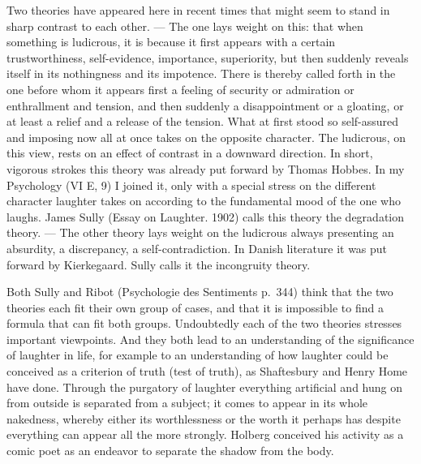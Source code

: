 \documentclass[12pt]{book}
\newcommand{\opage}[1]{\marginnote{\footnotesize\textit{[#1]}}}
\begin{document}
Two theories have appeared here in recent times that might seem to stand in sharp
contrast to each other. --- The one lays weight on this: that when something is
ludicrous, it is because it first appears with a certain trustworthiness,
self-evidence, importance, superiority, but then suddenly reveals itself in its
nothingness and its impotence. There is thereby called forth in the one before
whom it appears first a feeling of security or admiration or enthrallment and
tension, and then suddenly a disappointment or a gloating, or at least a relief and
a release of the tension. What at first stood so self-assured and imposing now all
at once takes on the opposite character. The ludicrous, on this view, rests on an
effect of contrast in a downward direction. In short, vigorous strokes this theory
was already put forward by Thomas Hobbes. In my Psychology \opage{49}(VI E, 9) I
joined it, only with a special stress on the different character laughter takes
on according to the fundamental mood of the one who laughs. James Sully (Essay on
Laughter. 1902) calls this theory the degradation theory. --- The other theory
lays weight on the ludicrous always presenting an absurdity, a discrepancy, a
self-contradiction. In Danish literature it was put forward by Kierkegaard. Sully
calls it the incongruity theory.

Both Sully and Ribot (Psychologie des Sentiments p.~344) think that the two
theories each fit their own group of cases, and that it is impossible to find a
formula that can fit both groups. Undoubtedly each of the two theories stresses
important viewpoints. And they both lead to an understanding of the significance
of laughter in life, for example to an understanding of how laughter could be
conceived as a criterion of truth (test of truth), as Shaftesbury and Henry Home
have done. Through the purgatory of laughter everything artificial and hung on
from outside is separated from a subject; it comes to appear in its whole
nakedness, whereby either its worthlessness or the worth it perhaps has despite
everything can appear all the more strongly. Holberg conceived his activity as a
comic poet as an endeavor to separate the shadow from the body.
\end{document}
